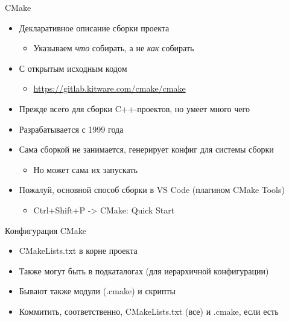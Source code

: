 \documentclass[aspectratio=169]{beamer}
\begin{document}
\begin{frame}{CMake}
    \begin{itemize}
        \item Декларативное описание сборки проекта
              \begin{itemize}
                  \item Указываем \textit{что} собирать, а не \textit{как} собирать
              \end{itemize}
        \item С открытым исходным кодом
              \begin{itemize}
                  \item \url{https://gitlab.kitware.com/cmake/cmake}
              \end{itemize}
        \item Прежде всего для сборки C++-проектов, но умеет много чего
        \item Разрабатывается с 1999 года
        \item Сама сборкой не занимается, генерирует конфиг для системы сборки
              \begin{itemize}
                  \item Но может сама их запускать
              \end{itemize}
        \item Пожалуй, основной способ сборки в VS Code (плагином CMake Tools)
              \begin{itemize}
                  \item Ctrl+Shift+P -> CMake: Quick Start
              \end{itemize}
    \end{itemize}
\end{frame}

\begin{frame}{Конфигурация CMake}
    \begin{itemize}
        \item CMakeLists.txt в корне проекта
        \item Также могут быть в подкаталогах (для иерархичной конфигурации)
        \item Бывают также модули (.cmake) и скрипты
        \item Коммитить, соответственно, CMakeLists.txt (все) и .cmake, если есть
    \end{itemize}
\end{frame}
\end{document}
